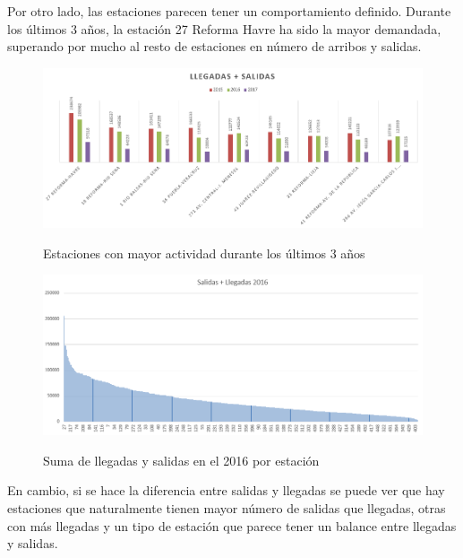 \documentclass[12pt,spanish]{article}
\begin{document}
	Por otro lado, las estaciones parecen tener un comportamiento definido. Durante los últimos 3 años, la estación 27 Reforma Havre ha sido la mayor demandada, superando por mucho al resto de estaciones en número de arribos y salidas.
	\begin{figure}[H]
		\centering
		\includegraphics[width=15cm]{Imagenes/estaciones_mayor_actividad.png}\\
		\begin{centering}
		\caption{Estaciones con mayor actividad durante los últimos 3 años}
		\end{centering}
	\end{figure}
	\begin{figure}[H]
		\centering
		\includegraphics[width=15cm]{Imagenes/salidas_y_llegadas_2016.png}\\
		\begin{centering}
		\caption{Suma de llegadas y salidas en el 2016 por estación}
		\end{centering}
	\end{figure}
	En cambio, si se hace la diferencia entre salidas y llegadas se puede ver que hay estaciones que naturalmente tienen mayor número de salidas que llegadas, otras con más llegadas y un tipo de estación que parece tener un balance entre llegadas y salidas.
\end{document}
